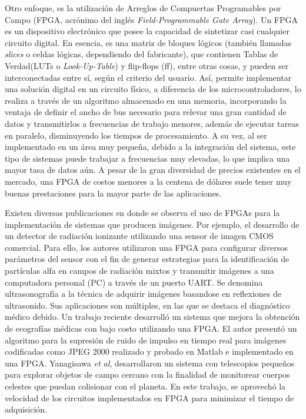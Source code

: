 Otro enfoque, es la utilización de Arreglos de Compuertas Programables por Campo (FPGA, acrónimo del inglés {\it Field-Programmable Gate Array}). Un FPGA es un dispositivo electrónico que posee la capacidad de sintetizar casi cualquier circuito digital. En esencia, es una matriz de bloques lógicos (también llamadas {\it slices} o celdas lógicas, dependiendo del fabricante), que contienen Tablas de Verdad(LUTs o {\it Look-Up-Table}) y flip-flops (ff), entre otras cosas, y pueden ser interconectadas entre sí, según el criterio del usuario. Así, permite implementar una solución digital en un circuito físico, a diferencia de los microcontroladores, lo realiza a través de un algoritmo almacenado en una memoria, incorporando la ventaja de definir el ancho de bus necesario para relevar una gran cantidad de datos y transmitirlos a frecuencias de trabajo menores, además de ejecutar tareas en paralelo, disminuyendo los tiempos de procesamiento. A su vez, al ser implementado en un área muy pequeña, debido a la integración del sistema, este tipo de sistemas puede trabajar a frecuencias muy elevadas, lo que implica una mayor tasa de datos aún. A pesar de la gran diversidad de precios existentes en el mercado, una FPGA de costos menores a la centena de dólares suele tener muy buenas prestaciones para la mayor parte de las aplicaciones.%

Existen diversas publicaciones en donde se observa el uso de FPGAs para la implementación de sistemas que producen imágenes. Por ejemplo, el desarrollo de un detector de radiación ionizante utilizando una sensor de imagen CMOS comercial. Para ello, los autores utilizaron una FPGA para configurar diversos parámetros del sensor con el fin de generar estrategias para la identificación de partículas alfa en campos de radiación mixtos y transmitir imágenes a una computadora personal (PC) a través de un puerto UART\cite{Perez2017}. Se denomina ultrasonografía a la técnica de adquirir imágenes basandose en reflexiones de ultrasonido. Sus aplicaciones son múltiples, en las que se destaca el diagnóstico médico debido. Un trabajo reciente desarrolló un sistema que mejora la obtención de ecografías médicas con bajo costo utilizando una FPGA\cite{biswas2018embedded}. El autor presentó un algoritmo para la supresión de ruido de impulso en tiempo real para imágenes codificadas como JPEG 2000 realizado y probado en Matlab e implementado en una FPGA. Yanagisawa {\it et al}, desarrollaron un sistema con telescopios pequeños para explorar objetos de campo cercano con la finalidad de monitorear cuerpos celestes que puedan colisionar con el planeta\cite{Yanagisawa2018}. En este trabajo, se aprovechó la velocidad de los circuitos implementados en FPGA para minimizar el tiempo de adquisición.%

